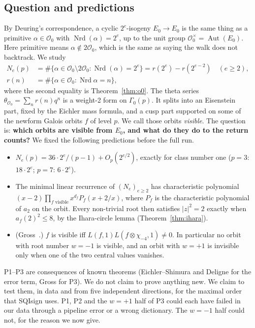 \documentclass[11pt,a4paper]{article}
\theoremstyle{definition}
\newcommand{\Oz}{\mathcal{O}_0}
\newcommand{\Nrd}{\operatorname{Nrd}}
\begin{document}
\subsection{Question and predictions}
By Deuring's correspondence, a cyclic $2^e$-isogeny $E_0\to E_0$ is the same thing as a primitive $\alpha\in\Oz$ with $\Nrd(\alpha)=2^e$, up to the unit group $\Oz^\times=\operatorname{Aut}(E_0)$. Here primitive means $\alpha\notin2\Oz$, which is the same as saying the walk does not backtrack. We study
\begin{align*}
N_e(p)&=\#\{\alpha\in\Oz\setminus2\Oz:\Nrd(\alpha)=2^e\}=r(2^e)-r(2^{e-2})\quad(e\ge2),\\
r(n)&=\#\{\alpha\in\Oz:\Nrd\alpha=n\},
\end{align*}
where the second equality is Theorem~\ref{thm:o0}. The theta series $\theta_{\Oz}=\sum_n r(n)q^n$ is a weight-2 form on $\Gamma_0(p)$. It splits into an Eisenstein part, fixed by the Eichler mass formula, and a cusp part supported on some of the newform Galois orbits $f$ of level $p$. We call those orbits \emph{visible}. The question is: \textbf{which orbits are visible from $E_0$, and what do they do to the return counts?} We fixed the following predictions before the full run.
\begin{itemize}
  \item[\textbf{P1}] $N_e(p)=36\cdot2^e/(p-1)+O_p(2^{e/2})$, exactly for class number one ($p=3$: $18\cdot2^e$; $p=7$: $6\cdot2^e$).
  \item[\textbf{P2}] The minimal linear recurrence of $(N_e)_{e\ge2}$ has characteristic polynomial $(x-2)\prod_{f\text{ visible}}x^{d_f}P_f(x+2/x)$, where $P_f$ is the characteristic polynomial of $a_2$ on the orbit. Every non-trivial root then satisfies $|z|^2=2$ exactly when $a_f(2)^2\le8$, by the Ihara-circle lemma (Theorem~\ref{thm:ihara}).
  \item[\textbf{P3}] (Gross~\cite{Gross1987}.) $f$ is visible iff $L(f,1)L(f\otimes\chi_{-4},1)\ne0$. In particular no orbit with root number $w=-1$ is visible, and an orbit with $w=+1$ is invisible only when one of the two central values vanishes.
\end{itemize}
P1--P3 are consequences of known theorems (Eichler--Shimura and Deligne for the error term, Gross for P3). We do not claim to prove anything new. We claim to test them, in data and from five independent directions, for the maximal order that SQIsign uses. P1, P2 and the $w=+1$ half of P3 could each have failed in our data through a pipeline error or a wrong dictionary. The $w=-1$ half could not, for the reason we now give.
\end{document}
